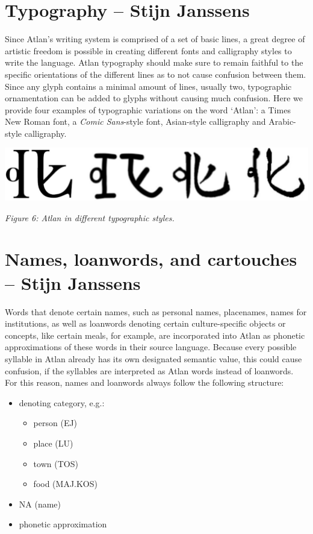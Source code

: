 \section{Typography -- {\small Stijn Janssens}}



\noindent Since Atlan’s writing system is comprised of a set of basic lines, a great degree of artistic freedom is possible in creating different fonts and calligraphy styles to write the language. Atlan typography should make sure to remain faithful to the specific orientations of the different lines as to not cause confusion between them. Since any glyph contains a minimal amount of lines, usually two, typographic ornamentation can be added to glyphs without causing much confusion. Here we provide four examples of typographic variations on the word ‘Atlan’: a Times New Roman font, a {\it Comic Sans}-style font, Asian-style calligraphy and Arabic-style calligraphy.


\begin{center}
\includegraphics[scale=0.15]{./Images/Atlogos.jpeg}

{\footnotesize \it Figure 6: Atlan in different typographic styles.}
\end{center}
\section{Names, loanwords, and cartouches -- {\small Stijn Janssens}}

Words that denote certain names, such as personal names, placenames, names for institutions, as well as loanwords denoting certain culture-specific objects or concepts, like certain meals, for example, are incorporated into Atlan as phonetic approximations of these words in their source language. Because every possible syllable in Atlan already has its own designated semantic value, this could cause confusion, if the syllables are interpreted as Atlan words instead of loanwords. For this reason, names and loanwords always follow the following structure: 

\begin{itemize}
	\item denoting category, e.g.: 
		\begin{itemize}
			\item[] person \ej (EJ)
			\item[] place \lu (LU)
			\item[] town \tos (TOS)
			\item[] food \maj \kos (MAJ.KOS)
		\end{itemize}
	\item NA \na (name)
	\item phonetic approximation  

\end{itemize}


